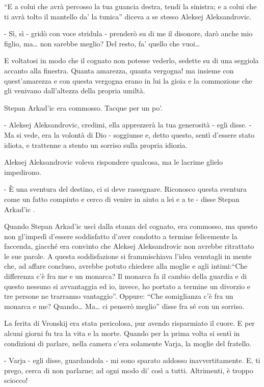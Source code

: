 ``E a colui che avrà percosso la tua guancia destra, tendi la sinistra; e a colui che ti avrà tolto il mantello da' la tunica'' diceva a se stesso Aleksej Aleksandrovic. 

- Sì, sì - gridò con voce stridula - prenderò su di me il disonore, darò anche mio figlio, ma\ldots{} non sarebbe meglio? Del resto, fa' quello che vuoi\ldots{} 

E voltatosi in modo che il cognato non potesse vederlo, sedette su di una seggiola accanto alla finestra. Quanta amarezza, quanta vergogna! ma insieme con quest'amarezza e con questa vergogna erano in lui la gioia e la commozione che gli venivano dall'altezza della propria umiltà. 

Stepan Arkad'ic era commosso. Tacque per un po'. 

- Aleksej Aleksandrovic, credimi, ella apprezzerà la tua generosità - egli disse. - Ma si vede, era la volontà di Dio - soggiunse e, detto questo, sentì d'essere stato idiota, e trattenne a stento un sorriso sulla propria idiozia. 

Aleksej Aleksandrovic voleva rispondere qualcosa, ma le lacrime glielo impedirono. 

- È una sventura del destino, ci si deve rassegnare. Riconosco questa sventura come un fatto compiuto e cerco di venire in aiuto a lei e a te - disse Stepan Arkad'ic . 

Quando Stepan Arkad'ic uscì dalla stanza del cognato, era commosso, ma questo non gl'impedì d'essere soddisfatto d'aver condotto a termine felicemente la faccenda, giacché era convinto che Aleksej Aleksandrovic non avrebbe ritrattato le sue parole. A questa soddisfazione si frammischiava l'idea venutagli in mente che, ad affare concluso, avrebbe potuto chiedere alla moglie e agli intimi:``Che differenza c'è fra me e un monarca? Il monarca fa il cambio della guardia e di questo nessuno si avvantaggia ed io, invece, ho portato a termine un divorzio e tre persone ne trarranno vantaggio''. Oppure: ``Che somiglianza c'è fra un monarca e me? Quando\ldots{} Ma\ldots{} ci penserò meglio'' disse fra sé con un sorriso. 

La ferita di Vronskij era stata pericolosa, pur avendo risparmiato il cuore. E per alcuni giorni fu tra la vita e la morte. Quando per la prima volta si sentì in condizioni di parlare, nella camera c'era solamente Varja, la moglie del fratello. 

- Varja - egli disse, guardandola - mi sono sparato addosso inavvertitamente. E, ti prego, cerca di non parlarne; ad ogni modo di' così a tutti. Altrimenti, è troppo sciocco! 

